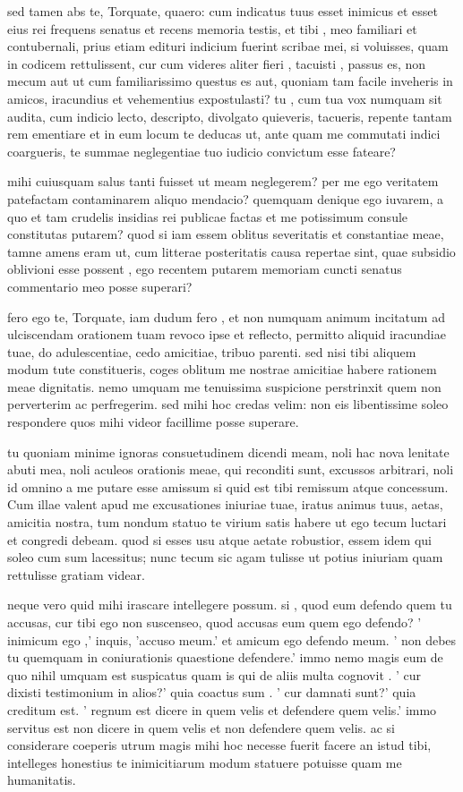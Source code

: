 sed tamen abs te, Torquate, quaero: cum indicatus tuus esset inimicus et esset eius rei frequens senatus et recens memoria testis, et tibi , meo familiari et contubernali, prius etiam edituri indicium fuerint scribae mei, si voluisses, quam in codicem rettulissent, cur cum videres aliter fieri , tacuisti , passus es, non mecum aut ut cum familiarissimo questus es aut, quoniam tam facile inveheris in amicos, iracundius et vehementius expostulasti? tu , cum tua vox numquam sit audita, cum indicio lecto, descripto, divolgato quieveris, tacueris, repente tantam rem ementiare et in eum locum te deducas ut, ante quam me commutati indici coargueris, te summae neglegentiae tuo iudicio convictum esse fateare?

 mihi cuiusquam salus tanti fuisset ut meam neglegerem? per me ego veritatem patefactam contaminarem aliquo mendacio? quemquam denique ego iuvarem, a quo et tam crudelis insidias rei publicae factas et me potissimum consule constitutas putarem? quod si iam essem oblitus severitatis et constantiae meae, tamne amens eram ut, cum litterae posteritatis causa repertae sint, quae subsidio oblivioni esse possent , ego recentem putarem memoriam cuncti senatus commentario meo posse superari?

 fero ego te, Torquate, iam dudum fero , et non numquam animum incitatum ad ulciscendam orationem tuam revoco ipse et reflecto, permitto aliquid iracundiae tuae, do adulescentiae, cedo amicitiae, tribuo parenti. sed nisi tibi aliquem modum tute constitueris, coges oblitum me nostrae amicitiae habere rationem meae dignitatis. nemo umquam me tenuissima suspicione perstrinxit quem non perverterim ac perfregerim. sed mihi hoc credas velim: non eis libentissime soleo respondere quos mihi videor facillime posse superare.

 tu quoniam minime ignoras consuetudinem dicendi meam, noli hac nova lenitate abuti mea, noli aculeos orationis meae, qui reconditi sunt, excussos arbitrari, noli id omnino a me putare esse amissum si quid est tibi remissum atque concessum. Cum illae valent apud me excusationes iniuriae tuae, iratus animus tuus, aetas, amicitia nostra, tum nondum statuo te virium satis habere ut ego tecum luctari et congredi debeam. quod si esses usu atque aetate robustior, essem idem qui soleo cum sum lacessitus; nunc tecum sic agam tulisse ut potius iniuriam quam rettulisse gratiam videar.

 neque vero quid mihi irascare intellegere possum. si , quod eum defendo quem tu accusas, cur tibi ego non suscenseo, quod accusas eum quem ego defendo? ' inimicum ego ,' inquis, 'accuso meum.' et amicum ego defendo meum. ' non debes tu quemquam in coniurationis quaestione defendere.' immo nemo magis eum de quo nihil umquam est suspicatus quam is qui de aliis multa cognovit . ' cur dixisti testimonium in alios?' quia coactus sum . ' cur damnati sunt?' quia creditum est. ' regnum est dicere in quem velis et defendere quem velis.' immo servitus est non dicere in quem velis et non defendere quem velis. ac si considerare coeperis utrum magis mihi hoc necesse fuerit facere an istud tibi, intelleges honestius te inimicitiarum modum statuere potuisse quam me humanitatis.

